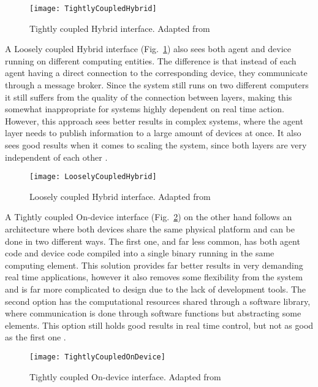 \begin{figure}[hbt!]
	\centering
	\texttt{[image: TightlyCoupledHybrid]}
	\caption{Tightly coupled Hybrid interface. Adapted from \cite{8591641}}
	\label{fig:tightly_coupled_hybrid}
\end{figure}

A Loosely coupled Hybrid interface (Fig.~\ref{fig:tightly_coupled_hybrid}) also sees both agent and device running on different computing entities. The difference is that instead of each agent having a direct connection to the corresponding device, they communicate through a message broker. Since the system still runs on two different computers it still suffers from the quality of the connection between layers, making this somewhat inappropriate for systems highly dependent on real time action. However, this approach sees better results in complex systems, where the agent layer needs to publish information to a large amount of devices at once. It also sees good results when it comes to scaling the system, since both layers are very independent of each other \cite{8591641}.\\

\begin{figure}[hbt!]
	\centering
	\texttt{[image: LooselyCoupledHybrid]}
	\caption{Loosely coupled Hybrid interface. Adapted from \cite{8591641}}
	\label{fig:loosely_coupled_hybrid}
\end{figure}

A Tightly coupled On-device interface (Fig.~\ref{fig:loosely_coupled_hybrid}) on the other hand follows an architecture where both devices share the same physical platform and can be done in two different ways. The first one, and far less common, has both agent code and device code compiled into a single binary running in the same computing element. This solution provides far better results in very demanding real time applications, however it also removes some flexibility from the system and is far more complicated to design due to the lack of development tools. The second option has the computational resources shared through a software library, where communication is done through software functions but abstracting some elements. This option still holds good results in real time control, but not as good as the first one \cite{8591641}.\\

\begin{figure}[hbt!]
	\centering
	\texttt{[image: TightlyCoupledOnDevice]}
	\caption{Tightly coupled On-device interface. Adapted from \cite{8591641}}
	\label{fig:tightly_coupled_ondevice}
\end{figure}

